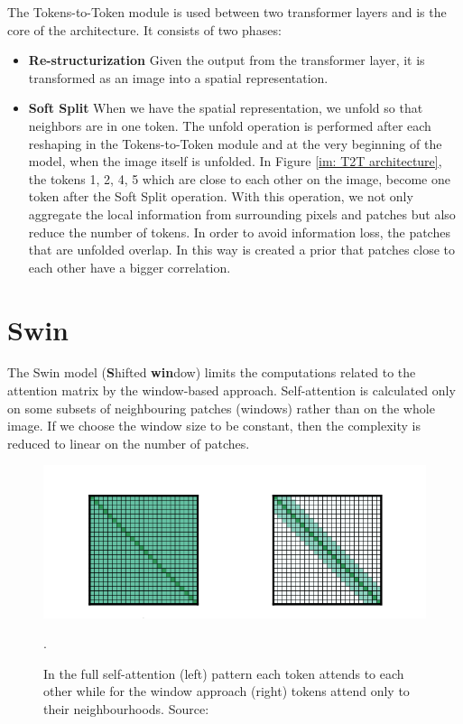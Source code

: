 \documentclass[magisterska,en]{pracamgr}
\begin{document}
The Tokens-to-Token module is used between two transformer layers and is the core of the architecture. It consists of two phases:
\begin{itemize}
	\item \textbf{Re-structurization} Given the output from the transformer layer, it is transformed as an image into a spatial representation.
	\item \textbf{Soft Split} When we have the spatial representation, we unfold so that neighbors are in one token. The unfold operation is performed after each reshaping in the Tokens-to-Token module and at the very beginning of the model, when the image itself is unfolded. In Figure \ref{im: T2T architecture}, the tokens 1, 2, 4, 5 which are close to each other on the image, become one token after the Soft Split operation. With this operation, we not only aggregate the local information from surrounding pixels and patches but also reduce the number of tokens. In order to avoid information loss, the patches that are unfolded overlap. In this way is created a prior that patches close to each other have a bigger correlation.

\end{itemize}





\section{Swin}\label{r:swin}
The Swin model (\textbf{S}hifted \textbf{win}dow) \cite{DBLP:conf/iccv/LiuL00W0LG21} limits the computations related to the attention matrix by the window-based approach. Self-attention is calculated only on some subsets of neighbouring patches (windows) rather than on the whole image. If we choose the window size to be constant, then the complexity is reduced to linear on the number of patches.

\begin{figure}[H]
\centering
\includegraphics[scale=0.4]{./images/sliding_window.png}
\caption{In the full self-attention (left) pattern each token attends to each other while for the window approach (right) tokens attend only to their neighbourhoods. Source: \cite{DBLP:journals/corr/abs-2004-05150}}.
\end{figure}
\end{document}
